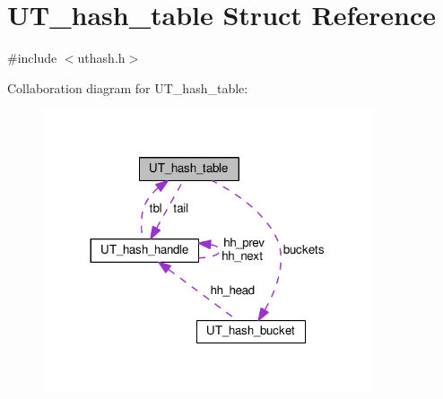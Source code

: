 \hypertarget{struct_u_t__hash__table}{}\section{U\+T\+\_\+hash\+\_\+table Struct Reference}
\label{struct_u_t__hash__table}


{\ttfamily \#include $<$uthash.\+h$>$}



Collaboration diagram for U\+T\+\_\+hash\+\_\+table\+:
\nopagebreak
\begin{figure}[H]
\begin{center}
\leavevmode
\includegraphics[width=276pt]{struct_u_t__hash__table__coll__graph}
\end{center}
\end{figure}
